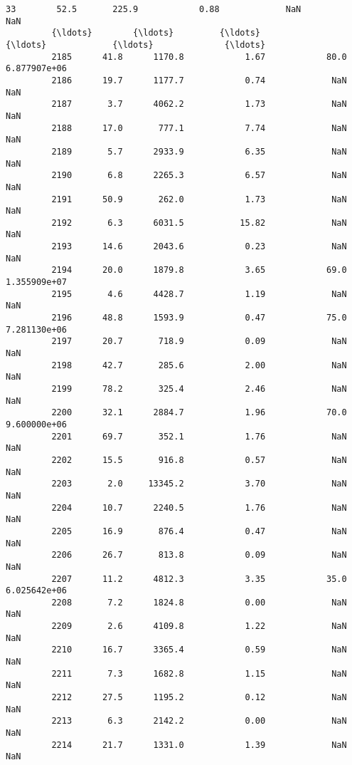 \documentclass[11pt]{llncs}
\begin{document}
\begin{Verbatim}[commandchars=\\\{\}]
         33        52.5       225.9            0.88             NaN              NaN   
         {\ldots}        {\ldots}         {\ldots}             {\ldots}             {\ldots}              {\ldots}   
         2185      41.8      1170.8            1.67            80.0     6.877907e+06   
         2186      19.7      1177.7            0.74             NaN              NaN   
         2187       3.7      4062.2            1.73             NaN              NaN   
         2188      17.0       777.1            7.74             NaN              NaN   
         2189       5.7      2933.9            6.35             NaN              NaN   
         2190       6.8      2265.3            6.57             NaN              NaN   
         2191      50.9       262.0            1.73             NaN              NaN   
         2192       6.3      6031.5           15.82             NaN              NaN   
         2193      14.6      2043.6            0.23             NaN              NaN   
         2194      20.0      1879.8            3.65            69.0     1.355909e+07   
         2195       4.6      4428.7            1.19             NaN              NaN   
         2196      48.8      1593.9            0.47            75.0     7.281130e+06   
         2197      20.7       718.9            0.09             NaN              NaN   
         2198      42.7       285.6            2.00             NaN              NaN   
         2199      78.2       325.4            2.46             NaN              NaN   
         2200      32.1      2884.7            1.96            70.0     9.600000e+06   
         2201      69.7       352.1            1.76             NaN              NaN   
         2202      15.5       916.8            0.57             NaN              NaN   
         2203       2.0     13345.2            3.70             NaN              NaN   
         2204      10.7      2240.5            1.76             NaN              NaN   
         2205      16.9       876.4            0.47             NaN              NaN   
         2206      26.7       813.8            0.09             NaN              NaN   
         2207      11.2      4812.3            3.35            35.0     6.025642e+06   
         2208       7.2      1824.8            0.00             NaN              NaN   
         2209       2.6      4109.8            1.22             NaN              NaN   
         2210      16.7      3365.4            0.59             NaN              NaN   
         2211       7.3      1682.8            1.15             NaN              NaN   
         2212      27.5      1195.2            0.12             NaN              NaN   
         2213       6.3      2142.2            0.00             NaN              NaN   
         2214      21.7      1331.0            1.39             NaN              NaN   
         

\end{Verbatim}
\end{document}
